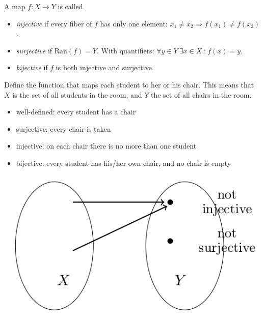 


\begin{Definition}
A map $f: X \to Y$ is called
\begin{itemize}
 \item \emph{injective} if every fiber of $f$ has only one element: $x_1 \neq x_2 \Rightarrow f(x_1) \neq f(x_2)$.
 \item \emph{surjective} if $\mathrm{Ran}(f)=Y$. With quantifiers: $\forall y\in Y~ \exists x\in X \,:\, f(x)=y$.
 \item \emph{bijective} if $f$ is both injective and surjective.
\end{itemize}
\end{Definition}


\begin{example}
Define the function that maps each student to
her or his chair. This means that $X$ is the set of all students in the room,
and $Y$ the set of all chairs in the room.
\begin{itemize}
 \item well-defined: every student has a chair
 \item surjective: every chair is taken
 \item injective: on each chair there is no more than one student
 \item bijective: every student has his/her own chair, and no chair is empty
\end{itemize}
\end{example}

\includegraphics{./notinj.png}

